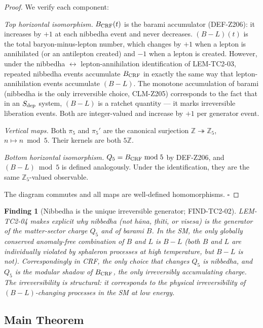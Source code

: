 \documentclass[12pt, a4paper]{article}
\newtheorem{finding}{Finding}[section]
\begin{document}
\begin{proof}
We verify each component:

\emph{Top horizontal isomorphism.} $B_{\rm CRF}(t)$ is the barami
accumulator (DEF-Z206): it increases by $+1$ at each nibbedha event
and never decreases. $(B-L)(t)$ is the total baryon-minus-lepton
number, which changes by $+1$ when a lepton is annihilated (or an
antilepton created) and $-1$ when a lepton is created. However,
under the nibbedha $\leftrightarrow$ lepton-annihilation
identification of LEM-TC2-03, repeated nibbedha events accumulate
$B_{\rm CRF}$ in exactly the same way that lepton-annihilation events
accumulate $(B-L)$. The monotone accumulation of barami (nibbedha is
the only irreversible choice, CLM-Z205) corresponds to the fact that
in an $S_{\rm dep}$ system, $(B-L)$ is a ratchet quantity --- it
marks irreversible liberation events. Both are integer-valued and
increase by $+1$ per generator event.

\emph{Vertical maps.} Both $\pi_5$ and $\pi_5'$ are the canonical
surjection $\mathbb{Z} \twoheadrightarrow \mathbb{Z}_5$,
$n \mapsto n \bmod 5$. Their kernels are both $5\mathbb{Z}$.

\emph{Bottom horizontal isomorphism.} $Q_5 = B_{\rm CRF} \bmod 5$
by DEF-Z206, and $(B-L)\bmod 5$ is defined analogously. Under the
identification, they are the same $\mathbb{Z}_5$-valued observable.

The diagram commutes and all maps are well-defined homomorphisms.
\hfill$\square$
\end{proof}

\begin{finding}[Nibbedha is the unique irreversible generator; FIND-TC2-02]
\label{find:irrev}
LEM-TC2-04 makes explicit why nibbedha (not hāna, ṭhiti, or visesa)
is the generator of the matter-sector charge $Q_5$ and of barami $B$.
In the SM, the only \emph{globally} conserved anomaly-free combination
of $B$ and $L$ is $B - L$ (both $B$ and $L$ are individually violated
by sphaleron processes at high temperature, but $B-L$ is not).
Correspondingly in CRF, the only choice that changes $Q_5$ is
nibbedha, and $Q_5$ is the modular shadow of $B_{\rm CRF}$, the only
irreversibly accumulating charge. The irreversibility is structural:
it corresponds to the physical irreversibility of $(B-L)$-changing
processes in the SM at low energy.
\end{finding}

\subsection{Main Theorem}
\label{sec:theorem}
\end{document}

